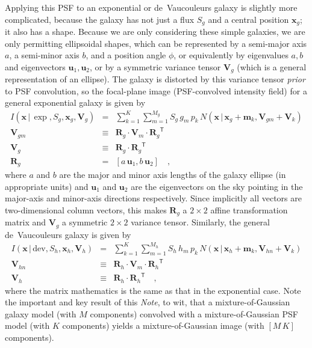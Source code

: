 \documentclass[12pt,pdftex,preprint]{aastex}
\newcommand{\documentname}{\textsl{Note}}
\newcommand{\tmatrix}[1]{\boldsymbol{#1}}
\newcommand{\transpose}[1]{{#1}^{\mathsf T}}
\newcommand{\tvector}[1]{\boldsymbol{#1}}
\newcommand{\pos}{\tvector{x}}
\newcommand{\mean}{\tvector{m}}
\newcommand{\var}{\tmatrix{V}\!}
\newcommand{\affine}{\tmatrix{R}}
\newcommand{\uv}{\tvector{u}}
\newcommand{\normal}{N}
\newcommand{\given}{\,|\,}
\newcommand{\dev}{\mathrm{dev}}
\begin{document}
Applying this PSF to an exponential or de~Vaucouleurs galaxy is
slightly more complicated, because the galaxy has not just a flux
$S_g$ and a central position $\pos_g$; it also has a shape.  Because
we are only considering these simple galaxies, we are only permitting
ellipsoidal shapes, which can be represented by a semi-major axis $a$,
a semi-minor axis $b$, and a position angle $\phi$, or equivalently by
eigenvalues $a, b$ and eigenvectors $\uv_1, \uv_2$, or by a symmetric
variance tensor $\var_g$ (which is a general representation of an
ellipse).  The galaxy is distorted by this variance tensor
\emph{prior} to PSF convolution, so the focal-plane image
(PSF-convolved intensity field) for a general exponential galaxy is
given by
\begin{eqnarray}\displaystyle
I(\pos\given\exp,S_g,\pos_g,\var_g) &=& \sum_{k=1}^K \sum_{m=1}^{M_g} S_g\,g_m\,p_k\,\normal(\pos\given\pos_g+\mean_k,\var_{gm}+\var_k)
\\
\var_{gm} &\equiv& \affine_g\cdot\var_m\cdot\transpose{\affine_g}
\\
\var_g &\equiv& \affine_g\cdot\transpose{\affine_g}
\\
\affine_g &=& \left[a\,\uv_1 , b\,\uv_2 \right]
\quad ,
\end{eqnarray}
where $a$ and $b$ are the major and minor axis lengths of the galaxy
ellipse (in appropriate units) and $\uv_1$ and $\uv_2$ are the
eigenvectors on the sky pointing in the major-axis and minor-axis
directions respectively.  Since implicitly all vectors are
two-dimensional column vectors, this makes $\affine_g$ a $2\times 2$
affine transformation matrix and $\var_g$ a symmetric $2\times 2$
variance tensor.  Similarly, the general de~Vaucouleurs galaxy is
given by
\begin{eqnarray}\displaystyle
I(\pos\given\dev,S_h,\pos_h,\var_h) &=& \sum_{k=1}^K \sum_{m=1}^{M_h} S_h\,h_m\,p_k\,\normal(\pos\given\pos_h+\mean_k,\var_{hn}+\var_k)
\\
\var_{hn} &\equiv& \affine_h\cdot\var_m\cdot\transpose{\affine_h}
\\
\var_h &\equiv& \affine_h\cdot\transpose{\affine_h}
\quad ,
\end{eqnarray}
where the matrix mathematics is the same as that in the exponential
case.  Note the important and key result of this \documentname, to
wit, that a mixture-of-Gaussian galaxy model (with $M$ components)
convolved with a mixture-of-Gaussian PSF model (with $K$ components)
yields a mixture-of-Gaussian image (with $[M\,K]$ components).
\end{document}
